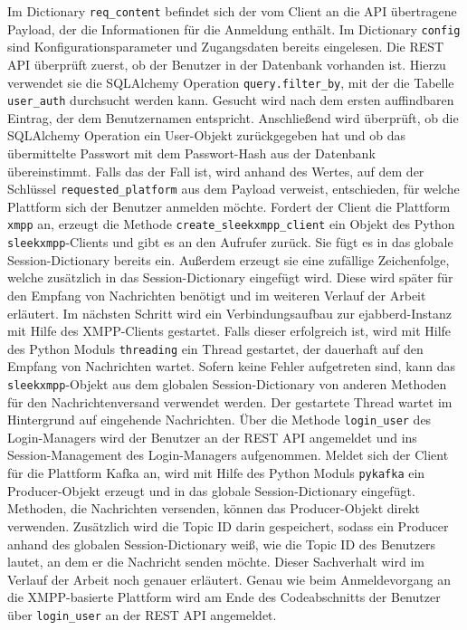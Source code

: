 \documentclass[a4paper,titlepage,halfparskip,12pt]{scrreprt}
\begin{document}
\begin{onehalfspacing}
Im Dictionary \texttt{req\_content} befindet sich der vom Client an die \acs{API} übertragene Payload, der die Informationen für die Anmeldung enthält. Im Dictionary \texttt{config} sind Konfigurationsparameter und Zugangsdaten bereits eingelesen. Die \acs{REST} \acs{API} überprüft zuerst, ob der Benutzer in der Datenbank vorhanden ist. Hierzu verwendet sie die SQLAlchemy Operation \texttt{query.filter\_by}, mit der die Tabelle \texttt{user\_auth} durchsucht werden kann. Gesucht wird nach dem ersten auffindbaren Eintrag, der dem Benutzernamen entspricht. Anschließend wird überprüft, ob die SQLAlchemy Operation ein User-Objekt zurückgegeben hat und ob das übermittelte Passwort mit dem Passwort-Hash aus der Datenbank übereinstimmt. Falls das der Fall ist, wird anhand des Wertes, auf dem der Schlüssel \texttt{requested\_platform} aus dem Payload verweist, entschieden, für welche Plattform sich der Benutzer anmelden möchte. Fordert der Client die Plattform \texttt{xmpp} an, erzeugt die Methode \texttt{create\_sleekxmpp\_client} ein Objekt des Python \texttt{sleekxmpp}-Clients und gibt es an den Aufrufer zurück. Sie fügt es in das globale Session-Dictionary bereits ein. Außerdem erzeugt sie eine zufällige Zeichenfolge, welche zusätzlich in das Session-Dictionary eingefügt wird. Diese wird später für den Empfang von Nachrichten benötigt und im weiteren Verlauf der Arbeit erläutert. Im nächsten Schritt wird ein Verbindungsaufbau zur ejabberd-Instanz mit Hilfe des \acs{XMPP}-Clients gestartet. Falls dieser erfolgreich ist, wird mit Hilfe des Python Moduls \texttt{threading} \cite{pythonThreading} ein Thread gestartet, der dauerhaft auf den Empfang von Nachrichten wartet. Sofern keine Fehler aufgetreten sind, kann das \texttt{sleekxmpp}-Objekt aus dem globalen Session-Dictionary von anderen Methoden für den Nachrichtenversand verwendet werden. Der gestartete Thread wartet im Hintergrund auf eingehende Nachrichten. Über die Methode \texttt{login\_user} des Login-Managers wird der Benutzer an der \acs{REST} \acs{API} angemeldet und ins Session-Management des Login-Managers aufgenommen.
Meldet sich der Client für die Plattform Kafka an, wird mit Hilfe des Python Moduls \texttt{pykafka} ein Producer-Objekt erzeugt und in das globale Session-Dictionary eingefügt. Methoden, die Nachrichten versenden, können das Producer-Objekt direkt verwenden. Zusätzlich wird die Topic ID darin gespeichert, sodass ein Producer anhand des globalen Session-Dictionary weiß, wie die Topic ID des Benutzers lautet, an dem er die Nachricht senden möchte. Dieser Sachverhalt wird im Verlauf der Arbeit noch genauer erläutert. Genau wie beim Anmeldevorgang an die \acs{XMPP}-basierte Plattform wird am Ende des Codeabschnitts der Benutzer über \texttt{login\_user} an der \acs{REST} \acs{API} angemeldet.


\end{onehalfspacing}
\end{document}
